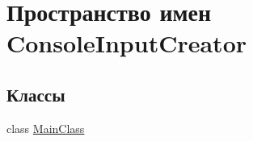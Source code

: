 \hypertarget{namespace_console_input_creator}{}\section{Пространство имен Console\+Input\+Creator}
\label{namespace_console_input_creator}
\subsection*{Классы}
\begin{DoxyCompactItemize}
\item 
class \hyperlink{class_console_input_creator_1_1_main_class}{Main\+Class}
\end{DoxyCompactItemize}
